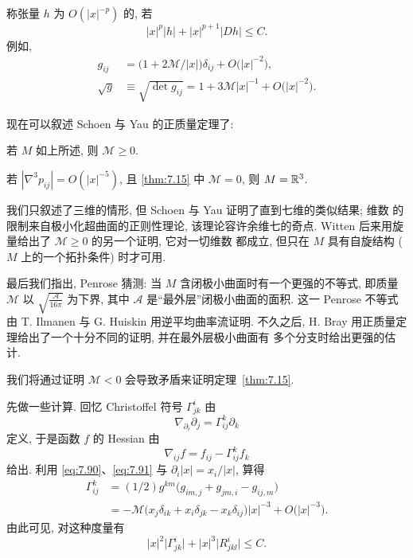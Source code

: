 称张量 $h$ 为 $O(|x|^{-p})$ 的, 若
\[
|x|^p|h|+|x|^{p+1}|Dh|\leq C.
\]
例如,
\begin{equation}
\begin{aligned}
g_{ij}&=\bigl(1+2\mathcal{M}/|x|\bigr)\delta_{ij}+O\bigl(|x|^{-2}\bigr),\\
\sqrt{g}&\equiv\sqrt{\det g_{ij}}
=1+3\mathcal{M}|x|^{-1}+O\bigl(|x|^{-2}\bigr).
\end{aligned}
\label{eq:7.92}
\end{equation}

现在可以叙述 Schoen 与 Yau 的正质量定理了:

\begin{theorem}
\label{thm:7.15}
若 $M$ 如上所述, 则 $\mathcal{M}\geq0$.
\end{theorem}

\begin{theorem}
\label{thm:7.16}
若 $|\nabla^3p_{ij}|=O(|x|^{-5})$, 且 \ref{thm:7.15} 中
$\mathcal{M}=0$, 则 $M=\mathbb{R}^3$.
\end{theorem}

我们只叙述了三维的情形, 但 Schoen 与 Yau 证明了直到七维的类似结果; 维数
的限制来自极小化超曲面的正则性理论, 该理论容许余维七的奇点. Witten
\cite{Wi} 后来用旋量给出了 $\mathcal{M}\geq0$ 的另一个证明, 它对一切维数
都成立, 但只在 $M$ 具有自旋结构 ($M$ 上的一个拓扑条件) 时才可用.

最后我们指出, Penrose 猜测: 当 $M$ 含闭极小曲面时有一个更强的不等式,
即质量 $\mathcal{M}$ 以 $\sqrt{\frac{\mathcal{A}}{16\pi}}$ 为下界, 其中
$\mathcal{A}$ 是``最外层''闭极小曲面的面积. 这一 Penrose 不等式由
T. Ilmanen 与 G. Huiskin \cite{HuI} 用逆平均曲率流证明. 不久之后, H. Bray
\cite{Br} 用正质量定理给出了一个十分不同的证明, 并在最外层极小曲面有
多个分支时给出更强的估计.

我们将通过证明 $\mathcal{M}<0$ 会导致矛盾来证明定理~\ref{thm:7.15}.

先做一些计算. 回忆 Christoffel 符号 $\Gamma_{jk}^i$ 由
\begin{equation}
\nabla_{\partial_i}\partial_j=\Gamma_{ij}^k\partial_k
\label{eq:7.93}
\end{equation}
定义, 于是函数 $f$ 的 Hessian 由
\begin{equation}
\nabla_{ij}f=f_{ij}-\Gamma_{ij}^kf_k
\label{eq:7.94}
\end{equation}
给出. 利用 \eqref{eq:7.90}、\eqref{eq:7.91} 与
$\partial_i|x|=x_i/|x|$, 算得
\begin{equation}
\begin{aligned}
\Gamma_{ij}^k&=(1/2)g^{km}\bigl(g_{im,j}+g_{jm,i}-g_{ij,m}\bigr)\\
&=-\mathcal{M}\bigl(x_j\delta_{ik}+x_i\delta_{jk}-x_k\delta_{ij}\bigr)
|x|^{-3}+O\bigl(|x|^{-3}\bigr).
\end{aligned}
\label{eq:7.95}
\end{equation}
由此可见, 对这种度量有
\begin{equation}
|x|^2\bigl|\Gamma_{jk}^i\bigr|+|x|^3\bigl|R_{jkl}^i\bigr|\leq C.
\label{eq:7.96}
\end{equation}

